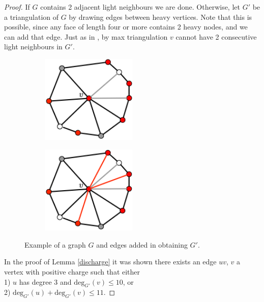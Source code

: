 \documentclass{article}
\newcommand{\0}{\mathbb{0}}
\newcommand{\1}{\mathbb{1}}
\begin{document}
\begin{proof}
 If $G$ contains  2 adjacent light neighbours we are done. Otherwise, let $G'$ be a triangulation of $G$ by drawing edges between heavy vertices. Note that this is possible, since any face of length four or more contains 2 heavy nodes, and we can add that edge.  Just as in \cite{JV13}, by max triangulation $v$ cannot have 2 consecutive light neighbours in $G'$.
\begin{figure}[h]
   \begin{center}
          \begin{subfigure}[t]{0.5\textwidth}
     \includegraphics[width=0.5\textwidth]{UntriangulatedDual.png}
         \end{subfigure} \hspace{-0.2\textwidth}
    \begin{subfigure}[t]{0.5\textwidth}
      \includegraphics[width=0.5\textwidth]{TriangulatedDual.png}
    \end{subfigure}
            \end{center}
  \caption{Example of a graph $G$ and edges added in obtaining $G'$.} \label{Triangulating}
   \end{figure}
 In the proof of Lemma \ref{discharge} it was shown there exists an edge $uv$, $v$  a vertex with positive charge such that either \\
 1) $u$ has degree 3 and $\text{deg}_{G'}(v) \leq 10$, or \\
 2) $\text{deg}_{G'}(u)+ \text{deg}_{G'}(v) \leq 11$.


\end{proof}
\end{document}
